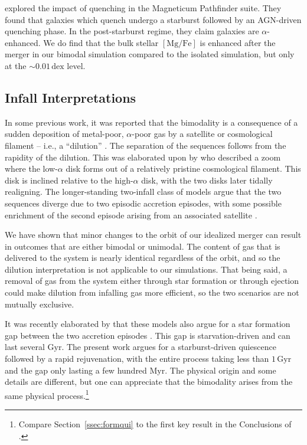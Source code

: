 \documentclass[twocolumn,linenumbers,trackchanges]{aastex631}
\newcommand{\Gyr}{\ensuremath{\textrm{Gyr}}}
\newcommand{\Myr}{\ensuremath{\textrm{Myr}}}
\newcommand{\MgFe}{\ensuremath{[\textrm{Mg}/\textrm{Fe}]}}
\newcommand{\dex}{\ensuremath{\textrm{dex}}}
\begin{document}
\citet{2023arXiv231016085K} explored the impact of quenching in the Magneticum Pathfinder suite. They found that galaxies which quench undergo a starburst followed by an AGN-driven quenching phase. In the post-starburst regime, they claim galaxies are $\alpha$-enhanced. We do find that the bulk stellar \MgFe{} is enhanced after the merger in our bimodal simulation compared to the isolated simulation, but only at the $\sim0.01\,\dex$ level.

\subsection{Infall Interpretations}\label{ssec:dilute}
In some previous work, it was reported that the bimodality is a consequence of a sudden deposition of metal-poor, $\alpha$-poor gas by a satellite or cosmological filament -- i.e., a ``dilution'' \citep{2020MNRAS.491.5435B,2021MNRAS.503.5846R}. The separation of the sequences follows from the rapidity of the dilution. This was elaborated upon by \citet{2021MNRAS.503.5868R} who described a zoom where the low-$\alpha$ disk forms out of a relatively pristine cosmological filament. This disk is inclined relative to the high-$\alpha$ disk, with the two disks later tidally realigning. The longer-standing two-infall class of models argue that the two sequences diverge due to two episodic accretion episodes, with some possible enrichment of the second episode arising from an associated satellite \citep{1997ApJ...477..765C,2009IAUS..254..191C,2017MNRAS.472.3637G,2019A&A...623A..60S}.

We have shown that minor changes to the orbit of our idealized merger can result in outcomes that are either bimodal or unimodal. The content of gas that is delivered to the system is nearly identical regardless of the orbit, and so the dilution interpretation is not applicable to our simulations. That being said, a removal of gas from the system either through star formation or through ejection could make dilution from infalling gas more efficient, so the two scenarios are not mutually exclusive.

It was recently elaborated by \citet{2024arXiv240511025S} that these models also argue for a star formation gap between the two accretion episodes \citep[see also][]{1996ASPC...92..307G,1998A&A...338..161F,2000A&A...358..671G,2015A&A...578A..87S,2020A&A...640A..81N}. This gap is starvation-driven and can last several \Gyr{}. The present work argues for a starburst-driven quiescence followed by a rapid rejuvenation, with the entire process taking less than $1\,\Gyr$ and the gap only lasting a few hundred \Myr{}. The physical origin and some details are different, but one can appreciate that the bimodality arises from the same physical process.\footnote{Compare Section~\ref{ssec:formqui} to the first key result in the Conclusions of \citet{2024arXiv240511025S}.}
\end{document}
